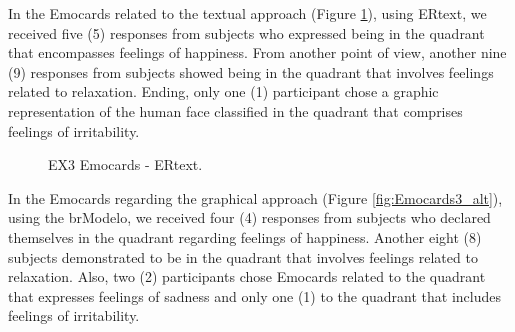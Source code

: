 In the Emocards related to the textual approach (Figure \ref{fig:Emocards4_alt}), using ERtext, we received five (5) responses from subjects who expressed being in the quadrant that encompasses feelings of happiness.
From another point of view, another nine (9) responses from subjects showed being in the quadrant that involves feelings related to relaxation. 
Ending, only one (1) participant chose a graphic representation of the human face classified in the quadrant that comprises feelings of irritability.

\begin{figure}[!htb]
    \centering
    \caption{EX3 Emocards - ERtext.}
    \label{fig:Emocards4_alt}
    
\end{figure}

In the Emocards regarding the graphical approach (Figure \ref{fig:Emocards3_alt}), using the brModelo, we received four (4) responses from subjects who declared themselves in the quadrant regarding feelings of happiness.
Another eight (8) subjects demonstrated to be in the quadrant that involves feelings related to relaxation.
Also, two (2) participants chose Emocards related to the quadrant that expresses feelings of sadness and only one (1) to the quadrant that includes feelings of irritability.

